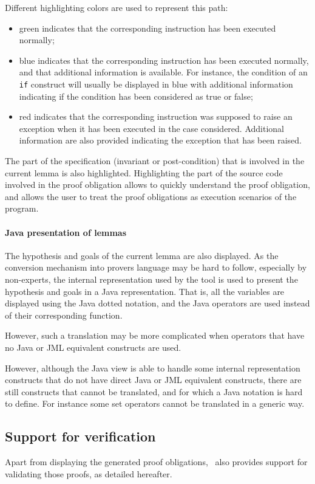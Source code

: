 Different highlighting colors are used to represent this path:
\begin{itemize}
\item green indicates that the corresponding instruction has been
   executed normally;
\item blue indicates that the corresponding instruction has been
   executed normally, and that additional information is
   available. For instance, the condition of an \texttt{if} construct will
   usually be displayed in blue with additional information indicating
   if the condition has been considered as true or false;
\item red indicates that the corresponding instruction was supposed to
   raise an exception when it has been executed in the case
   considered.  Additional information are also provided indicating
   the exception that has been raised.
\end{itemize}
The part of the specification (invariant or post-condition) that is
involved in the current lemma is also highlighted.  Highlighting the
part of the source code involved in the proof obligation allows to
quickly understand the proof obligation, and allows the user to treat
the proof obligations as execution scenarios of the program.
\paragraph{Java presentation of lemmas}
The hypothesis and goals of the current lemma are also displayed. As
the conversion mechanism into provers language may be hard to follow, especially by
non-experts, the internal representation used by the tool is used to
present the hypothesis and goals in a Java representation. That is,
all the variables are displayed using the Java dotted notation, and
the Java operators are used instead of their corresponding function.

However, such a translation may be more complicated when operators that
have no Java or JML equivalent constructs are used.  


 However, although the Java view is able to handle some internal
 representation constructs that do not have direct Java or JML
 equivalent constructs, there are still constructs that cannot be
 translated, and for which a Java notation is hard to define. For
 instance some set operators cannot be translated in a generic way.

\subsection{Support for verification}
Apart from displaying the generated proof obligations, \JACK\ also
provides support for validating those proofs, as detailed hereafter.
